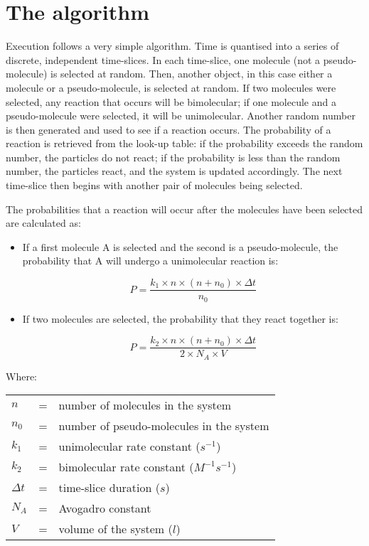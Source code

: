 \section{The \stochsim{} algorithm}\label{algorithm}
Execution follows a very simple algorithm. Time is quantised into a
series of discrete, independent time-slices. In each time-slice, one
molecule (not a pseudo-molecule) is selected at random. Then, another
object, in this case either a molecule or a pseudo-molecule, is
selected at random. If two molecules were selected, any reaction that
occurs will be bimolecular; if one molecule and a pseudo-molecule were
selected, it will be unimolecular. Another random number is then
generated and used to see if a reaction occurs. The probability of a
reaction is retrieved from the look-up table: if the probability
exceeds the random number, the particles do not react; if the
probability is less than the random number, the particles react, and
the system is updated accordingly.  The next time-slice then begins
with another pair of molecules being selected.

The probabilities that a reaction will occur after the molecules have
been selected are calculated as:
\begin{itemize}
\item If a first molecule A is selected and the second is a
  pseudo-molecule, the probability that A will undergo a
  unimolecular reaction is:
 
 \begin{displaymath}
    P = \frac{k_1\times{}n\times{}(n+n_0)\times\Delta{}t}{n_0}
  \end{displaymath}

\item If two molecules are selected, the 
probability that they react together is:

  \begin{displaymath}
    P = \frac{k_2\times{}n\times{}(n+n_0)\times\Delta{}t}{2\times{}N_A\times{}V}
  \end{displaymath}
\end{itemize}

Where:

\begin{tabular}{lll}
$n$         & = & number of molecules in the system\\
$n_0$       & = & number of pseudo-molecules in the system\\
$k_1$       & = & unimolecular rate constant ($s^{-1}$)\\
$k_2$       & = & bimolecular rate constant ($M^{-1}s^{-1}$)\\
$\Delta{}t$ & = & time-slice duration ($s$)\\
$N_A$       & = & Avogadro constant\\
$V$         & = & volume of the system ($l$)
\end{tabular}


